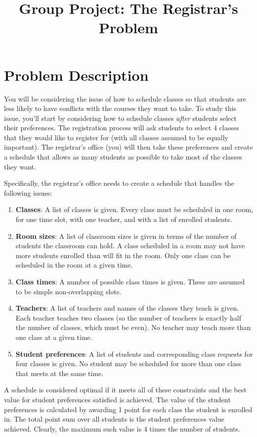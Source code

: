 \documentclass[12pt]{article}
\title{Group Project: The Registrar's Problem}
\date{}
\begin{document}
\maketitle

\section{Problem Description}
You will be considering the issue of how to schedule classes so that students are less likely to have conflicts with the courses they want to take.  To study this issue, you'll start by considering how to schedule classes \emph{after} students select their preferences.  The registration process will ask students to select 4 classes that they would like to register for (with all classes assumed to be equally important). The registrar's office (you) will then take these preferences and create a schedule that allows as many students as possible to take most of the classes they want.

Specifically, the registrar's office needs to create a schedule that handles the following issues:
\begin{enumerate}
\item \textbf{Classes}: A list of classes is given. Every class must be scheduled in one room, for one time slot, with one teacher, and with a list of enrolled students.
\item \textbf{Room sizes}: A list of classroom sizes is given in terms of the number of students the classroom can hold. A class scheduled in a room may not have more students enrolled than will fit in the room. Only one class can be scheduled in the room at a given time.
\item \textbf{Class times}: A number of possible class times is given. These are assumed to be simple non-overlapping slots.
\item \textbf{Teachers}: A list of teachers and names of the classes they teach is given. Each teacher teaches two classes (so the number of teachers is exactly half the number of classes, which must be even). No teacher may teach more than one class at a given time.
\item \textbf{Student preferences}: A list of students and corresponding class requests for four classes is given. No student may be scheduled for more than one class that meets at the same time.
\end{enumerate}

A schedule is considered optimal if it meets all of these constraints and the best value for student preferences satisfied is achieved. The value of the student preferences is calculated by awarding 1 point for each class the student is enrolled in. The total point sum over all students is the student preferences value achieved. Clearly, the maximum such value is 4 times the number of students.
\end{document}
